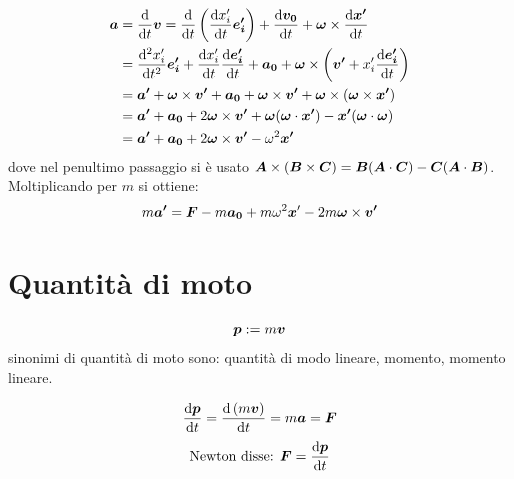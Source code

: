 \begin{align*}
 \ve{a}&=\frac{\ud}{\ud t}\ve{v}=\frac{\ud}{\ud t}\left(\frac{\ud x'_i}{\ud t}\ve{e'_i}\right)+\frac{\ud\ve{v_0}}{\ud t}+\ve\omega\times\frac{\ud\ve{x'}}{\ud t}\\
&=\frac{\ud^2 x'_i}{\ud t^2}\ve{e'_i}+\frac{\ud x'_i}{\ud t}\frac{\ud\ve{e'_i}}{\ud t}+\ve{a_0}+\ve\omega\times\left(\ve{v'}+x'_i\frac{\ud\ve{e'_i}}{\ud t}\right)\\
&=\ve{a'}+\ve\omega\times\ve{v'}+\ve{a_0}+\ve\omega\times\ve{v'}+\ve\omega\times\left(\ve\omega\times\ve{x'}\right)\\
&=\ve{a'}+\ve{a_0}+2\ve\omega\times\ve{v'}+\ve{\omega}(\ve\omega\cdot\ve{x'})-\ve{x'}(\ve\omega\cdot\ve\omega)\\
&=\ve{a'}+\ve{a_0}+2\ve\omega\times\ve{v'}-\omega^2\ve{x'}
\end{align*}
dove nel penultimo passaggio si è usato $\ve A\times(\ve B\times \ve C)=\ve{B}(\ve{A}\cdot\ve{C})-\ve{C}(\ve{A}\cdot\ve{B})$. Moltiplicando per $m$ si ottiene:
\begin{equation}
 m\ve{a'}=\ve F-m\ve{a_0}+m\omega^2\ve x'-2m\ve\omega\times\ve{v'}
\end{equation}







\section{Quantità di moto}
\begin{Def}
\begin{equation}
\ve{p}:=m\ve{v}
\end{equation}
sinonimi di quantità di moto sono: quantità di modo lineare, momento, momento lineare.
\end{Def}
\begin{equation*}\frac{\ud \ve p}{\ud t}=\frac{\ud\left(m\ve v\right)}{\ud t}=m\ve a=\ve F\end{equation*}
\begin{equation*}\text{Newton disse: }\ve F=\frac{\ud \ve p}{\ud t}\end{equation*}
